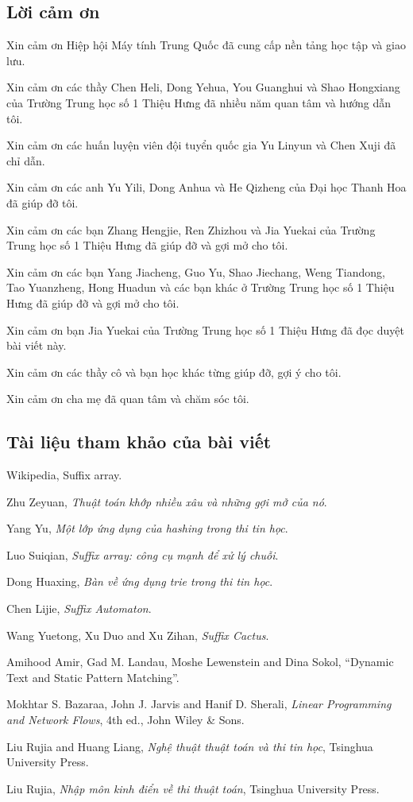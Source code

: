 \documentclass[11pt]{article}
\begin{document}
\subsection{Lời cảm ơn}

Xin cảm ơn Hiệp hội Máy tính Trung Quốc đã cung cấp nền tảng học tập và giao
lưu.

Xin cảm ơn các thầy Chen Heli, Dong Yehua, You Guanghui và Shao Hongxiang của
Trường Trung học số 1 Thiệu Hưng đã nhiều năm quan tâm và hướng dẫn tôi.

Xin cảm ơn các huấn luyện viên đội tuyển quốc gia Yu Linyun và Chen Xuji đã chỉ
dẫn.

Xin cảm ơn các anh Yu Yili, Dong Anhua và He Qizheng của Đại học Thanh Hoa đã
giúp đỡ tôi.

Xin cảm ơn các bạn Zhang Hengjie, Ren Zhizhou và Jia Yuekai của Trường Trung học
số 1 Thiệu Hưng đã giúp đỡ và gợi mở cho tôi.

Xin cảm ơn các bạn Yang Jiacheng, Guo Yu, Shao Jiechang, Weng Tiandong, Tao
Yuanzheng, Hong Huadun và các bạn khác ở Trường Trung học số 1 Thiệu Hưng đã
giúp đỡ và gợi mở cho tôi.

Xin cảm ơn bạn Jia Yuekai của Trường Trung học số 1 Thiệu Hưng đã đọc duyệt bài
viết này.

Xin cảm ơn các thầy cô và bạn học khác từng giúp đỡ, gợi ý cho tôi.

Xin cảm ơn cha mẹ đã quan tâm và chăm sóc tôi.

\subsection*{Tài liệu tham khảo của bài viết}

\begin{enumerate}[label={[\arabic*]},leftmargin=3em]
  \item Wikipedia, Suffix array.
  \item Zhu Zeyuan, \emph{Thuật toán khớp nhiều xâu và những gợi mở của nó}.
  \item Yang Yu, \emph{Một lớp ứng dụng của hashing trong thi tin học}.
  \item Luo Suiqian, \emph{Suffix array: công cụ mạnh để xử lý chuỗi}.
  \item Dong Huaxing, \emph{Bàn về ứng dụng trie trong thi tin học}.
  \item Chen Lijie, \emph{Suffix Automaton}.
  \item Wang Yuetong, Xu Duo and Xu Zihan, \emph{Suffix Cactus}.
  \item Amihood Amir, Gad M. Landau, Moshe Lewenstein and Dina Sokol,
  ``Dynamic Text and Static Pattern Matching''.
  \item Mokhtar S. Bazaraa, John J. Jarvis and Hanif D. Sherali,
  \emph{Linear Programming and Network Flows}, 4th ed., John Wiley \& Sons.
  \item Liu Rujia and Huang Liang, \emph{Nghệ thuật thuật toán và thi tin học},
  Tsinghua University Press.
  \item Liu Rujia, \emph{Nhập môn kinh điển về thi thuật toán}, Tsinghua
  University Press.
\end{enumerate}
\end{document}
